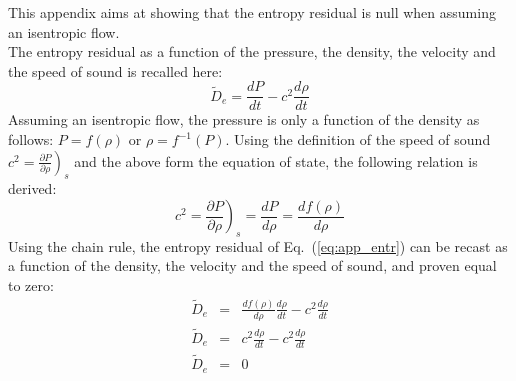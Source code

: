 \documentclass[preprint,10pt]{elsarticle}
\newcommand{\eqt}[1]{Eq.~(\ref{#1})}                     %
\begin{document}
This appendix aims at showing that the entropy residual is null when assuming an isentropic flow. \\
The entropy residual as a function of the pressure, the density, the velocity and the speed of sound is recalled here:
%
\begin{equation}\label{eq:app_entr}
\tilde{D}_e = \frac{dP}{dt} - c^2 \frac{d \rho}{dt}
\end{equation}
%
Assuming an isentropic flow, the pressure is only a function of the density as follows: $P = f( \rho )$ or $\rho = f^{-1}( P )$. Using the definition of the speed of sound $c^2 = \left. \frac{\partial P}{\partial \rho} \right)_s$ and the above form the equation of state, the following relation is derived:
%
\begin{equation}\label{eq:app_sp}
c^2 = \left. \frac{\partial P}{\partial \rho} \right)_s = \frac{d P}{d \rho} = \frac{d f(\rho)}{d \rho}
\end{equation}
%
Using the chain rule, the entropy residual of \eqt{eq:app_entr} can be recast as a function of the density, the velocity and the speed of sound, and proven equal to zero:
%
\begin{eqnarray}
\tilde{D}_e &=& \frac{d f(\rho)}{d \rho} \frac{d\rho}{dt} - c^2 \frac{d \rho}{dt} \nonumber\\
\tilde{D}_e &=& c^2 \frac{d\rho}{dt} - c^2 \frac{d \rho}{dt} \nonumber\\
\tilde{D}_e &=&  0 \nonumber
\end{eqnarray}

\end{document}
